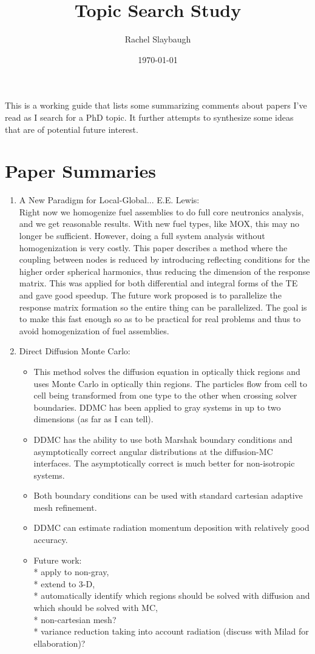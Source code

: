 \documentclass[12pt,twoside]{article}
\date{\today}
\title{Topic Search Study}
\author{Rachel Slaybaugh}
\begin{document}
\maketitle

This is a working guide that lists some summarizing comments about papers I've read as I search for a PhD topic. It further attempts to synthesize some ideas that are of potential future interest.

\section{Paper Summaries}

\begin{enumerate}
\item A New Paradigm for Local-Global... E.E. Lewis: \\
Right now we homogenize fuel assemblies to do full core neutronics analysis, and we get reasonable results. With new fuel types, like MOX, this may no longer be sufficient. However, doing a full system analysis without homogenization is very costly. This paper describes a method where the coupling between nodes is reduced by introducing reflecting conditions for the higher order spherical harmonics, thus reducing the dimension of the response matrix. This was applied for both differential and integral forms of the TE and gave good speedup. The future work proposed is to parallelize the response matrix formation so the entire thing can be parallelized. The goal is to make this fast enough so as to be practical for real problems and thus to avoid homogenization of fuel assemblies.

\item Direct Diffusion Monte Carlo: \\
\begin{itemize}
\item This method solves the diffusion equation in optically thick regions and uses Monte Carlo in optically thin regions. The particles flow from cell to cell being transformed from one type to the other when crossing solver boundaries. DDMC has been applied to gray systems in up to two dimensions (as far as I can tell).
\item DDMC has the ability to use both Marshak boundary conditions and asymptotically correct angular distributions at the diffusion-MC interfaces. The asymptotically correct is much better for non-isotropic systems.
\item Both boundary conditions can be used with standard cartesian adaptive mesh refinement. 
\item DDMC can estimate radiation momentum deposition with relatively good accuracy.
\item Future work: \\ * apply to non-gray, \\ * extend to 3-D, \\ * automatically identify which regions should be solved with diffusion and which should be solved with MC, \\ * non-cartesian mesh? \\ * variance reduction taking into account radiation (discuss with Milad for ellaboration)?
\end{itemize}


\end{enumerate}
\end{document}
